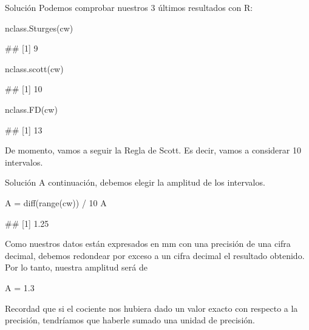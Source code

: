 \documentclass[
  ignorenonframetext,
  aspectratio=169]{beamer}
\newenvironment{Shaded}{\begin{snugshade}}{\end{snugshade}}
\newcommand{\DecValTok}[1]{\textcolor[rgb]{0.00,0.00,0.81}{#1}}
\newcommand{\FloatTok}[1]{\textcolor[rgb]{0.00,0.00,0.81}{#1}}
\newcommand{\FunctionTok}[1]{\textcolor[rgb]{0.00,0.00,0.00}{#1}}
\newcommand{\NormalTok}[1]{#1}
\newcommand{\OtherTok}[1]{\textcolor[rgb]{0.56,0.35,0.01}{#1}}
\newcommand{\SpecialCharTok}[1]{\textcolor[rgb]{0.00,0.00,0.00}{#1}}
\let\oldverbatim\verbatim
\let\endoldverbatim\endverbatim
\renewenvironment{verbatim}{\tiny\oldverbatim}{\endoldverbatim}
\begin{document}
\begin{frame}[fragile]{Solución}
\protect\hypertarget{soluciuxf3n-3}{}
Podemos comprobar nuestros 3 últimos resultados con R:

\begin{Shaded}
\begin{Highlighting}[]
\FunctionTok{nclass.Sturges}\NormalTok{(cw)}
\end{Highlighting}
\end{Shaded}

\begin{verbatim}
## [1] 9
\end{verbatim}

\begin{Shaded}
\begin{Highlighting}[]
\FunctionTok{nclass.scott}\NormalTok{(cw)}
\end{Highlighting}
\end{Shaded}

\begin{verbatim}
## [1] 10
\end{verbatim}

\begin{Shaded}
\begin{Highlighting}[]
\FunctionTok{nclass.FD}\NormalTok{(cw)}
\end{Highlighting}
\end{Shaded}

\begin{verbatim}
## [1] 13
\end{verbatim}

De momento, vamos a seguir la Regla de Scott. Es decir, vamos a
considerar 10 intervalos.
\end{frame}

\begin{frame}[fragile]{Solución}
\protect\hypertarget{soluciuxf3n-4}{}
A continuación, debemos elegir la amplitud de los intervalos.

\begin{Shaded}
\begin{Highlighting}[]
\NormalTok{A }\OtherTok{=} \FunctionTok{diff}\NormalTok{(}\FunctionTok{range}\NormalTok{(cw)) }\SpecialCharTok{/} \DecValTok{10}
\NormalTok{A}
\end{Highlighting}
\end{Shaded}

\begin{verbatim}
## [1] 1.25
\end{verbatim}

Como nuestros datos están expresados en mm con una precisión de una
cifra decimal, debemos redondear por exceso a un cifra decimal el
resultado obtenido. Por lo tanto, nuestra amplitud será de

\begin{Shaded}
\begin{Highlighting}[]
\NormalTok{A }\OtherTok{=} \FloatTok{1.3}
\end{Highlighting}
\end{Shaded}

Recordad que si el cociente nos hubiera dado un valor exacto con
respecto a la precisión, tendríamos que haberle sumado una unidad de
precisión.
\end{frame}
\end{document}
